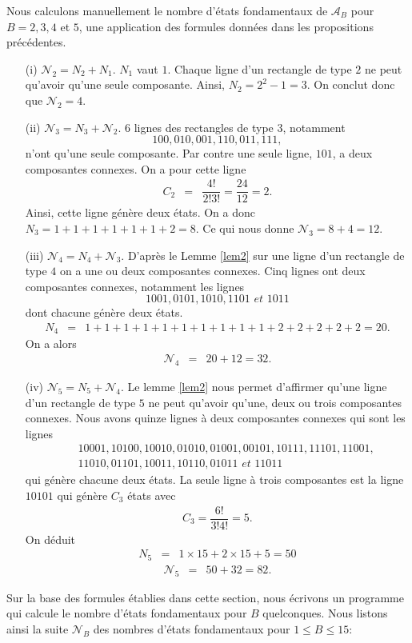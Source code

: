 \begin{Ex}\label{ex12}
Nous calculons manuellement le nombre d'états fondamentaux de $\mathcal{A}_{B}$ pour $B=2,3,4$ et $5$, une application des formules données dans les propositions précédentes.
\begin{itemize}
\item[(i)] $\mathcal{N}_{2} = N_{2} +N_{1}$. $N_{1}$ vaut $1$. Chaque ligne d'un rectangle de type $2$ ne peut qu'avoir qu'une seule composante. Ainsi, $N_{2} = 2^{2}-1=3$. On conclut donc que $\mathcal{N}_{2} =4.$
\item[(ii)] $\mathcal{N}_{3} = N_{3} + \mathcal{N}_{2}$. $6$ lignes des rectangles de type $3$, notamment $$100, 010, 001, 110, 011, 111, $$ n'ont qu'une seule composante. Par contre une seule ligne, $101$, a deux composantes connexes. On a pour cette ligne 
\begin{eqnarray*}
C_{2} & = & \dfrac{4!}{2!3!} =  \dfrac{24}{12} =  2.
\end{eqnarray*}
Ainsi, cette ligne génère deux états. On a donc $N_{3}= 1+1+1+1+1+1 +2=8.$ Ce qui nous donne $\mathcal{N}_{3}= 8 +4 =12.$
\item[(iii)] $\mathcal{N}_{4} = N_{4} + \mathcal{N}_{3}$. D'après le Lemme \ref{lem2} sur une ligne d'un rectangle de type $4$ on a une ou deux composantes connexes. Cinq lignes ont deux composantes connexes, notamment les lignes $$1001, 0101, 1010, 1101 \textit{  et } 1011 $$  dont chacune génère  deux états.
\begin{eqnarray*}
N_{4} & = & 1+1+1+1+1+1+1+1+1+1+2+2+2+2+2=20.
\end{eqnarray*}
On a alors
\begin{eqnarray*}
 \mathcal{N}_{4} & = & 20 + 12= 32.
\end{eqnarray*}
\item[(iv)] $\mathcal{N}_{5} =N_{5} + \mathcal{N}_{4}$. Le lemme \ref{lem2} nous permet d'affirmer qu'une ligne d'un rectangle  de type $5$ ne peut qu'avoir qu'une, deux ou trois composantes connexes. Nous avons quinze lignes à deux composantes connexes qui sont les lignes
\begin{eqnarray*}
& & 10001, 10100, 10010, 01010, 01001, 00101, 10111, 11101, 11001,\\
& &11010, 01101, 10011, 10110, 01011 \textit{ et } 11011
\end{eqnarray*}
qui génère chacune deux états.
La seule ligne à trois composantes est la ligne $10101$ qui génère $C_{3}$ états avec
\begin{eqnarray*}
C_{3}=\dfrac{6!}{3!4!}  = 5.
\end{eqnarray*} On déduit
\begin{eqnarray*}
N_{5} & = &  1\times 15 + 2\times 15 + 5= 50
\end{eqnarray*}
\begin{eqnarray*}
\mathcal{N}_{5} & = & 50 +32 =82.
\end{eqnarray*}
\end{itemize}
\end{Ex}
Sur la base des formules établies dans cette section, nous écrivons un programme qui calcule le nombre d'états fondamentaux pour $B$ quelconques. Nous listons ainsi la suite $\mathcal{N}_{B}$ des nombres d'états fondamentaux  pour  $1\leq B\leq 15$:

